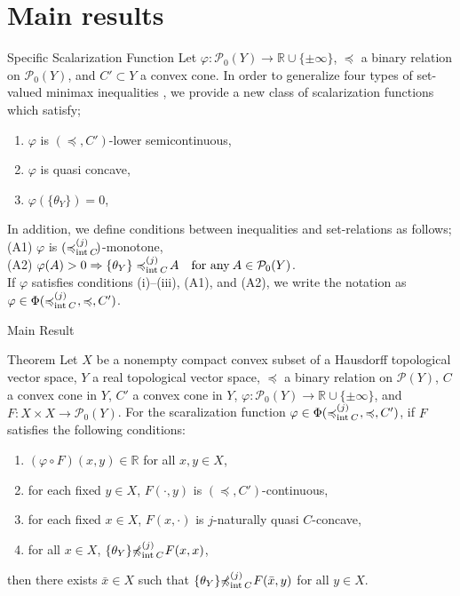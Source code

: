 \documentclass[aspectratio=169, dvipdfmx, 11pt]{beamer}
\newcommand{\RealNumberSet}{\mathbb{R}}
\newcommand{\Interior}[1]{\text{\rm int\:${#1}$}} %
\newcommand{\pow}[1]{\mathcal{P}_{0}(#1)}
\newcommand{\setrel}[2]{\preccurlyeq^{(#1)}_{#2}\!}
\newcommand{\notsetrel}[2]{{\not\preccurlyeq}^{(#1)}_{#2}\!}
\begin{document}
\section{Main results}

\begin{frame}{Specific Scalarization Function}
  Let $\varphi: \pow{Y} \to \RealNumberSet \cup \{\pm \infty\}$, $\preccurlyeq$ a binary relation
  on $\pow{Y}$, and $C' \subset Y$  a convex cone.
  In order to generalize four types of set-valued minimax inequalities \cite{MR2778674},
  we provide a new class of scalarization functions which satisfy;
  \begin{enumerate}
    \item $\varphi$ is $(\preccurlyeq, C')$-lower semicontinuous,
    \item $\varphi$ is quasi concave,
    \item $\varphi(\{\theta_{Y}\}) = 0$,
  \end{enumerate}
  In addition, we define conditions between inequalities and set-relations as follows;\\
  \vspace{2mm}
  (A1) $\varphi$ is $(\setrel{j}{\Interior{C}})$-monotone,\\
  (A2) $\varphi (A) > 0 \Rightarrow  \{\theta_Y\} \setrel{j}{\Interior{C}} A \quad\text{for any}\:A \in \pow{Y}$.\\
  \vspace{2mm}
  If $\varphi$ satisfies conditions (i)--(iii), (A1), and (A2),
  we write the notation as $\varphi \in \Phi(\setrel{j}{\Interior{C}}\:, \preccurlyeq, C')$.
\end{frame}

\begin{frame}{Main Result}
  \begin{block}{Theorem}
    Let $X$ be a nonempty compact convex subset of a Hausdorff topological vector space,
    $Y$ a real topological vector space, $\preccurlyeq$ a binary relation on $\mathcal{P}(Y)$,
    $C$ a convex cone in $Y$, $C'$ a convex cone in $Y$,
    $\varphi\colon \pow{Y} \to \RealNumberSet \cup \{\pm \infty\}$,
    and $F\colon X \times X \to \pow{Y}$.
    For the scaralization function $\varphi \in \Phi(\setrel{j}{\Interior{C}}\:, \preccurlyeq, C')$,
    if $F$ satisfies the following conditions:
    \begin{enumerate}
      \item $(\varphi \circ F)(x,y) \in \RealNumberSet$ for all $x,y \in X$,
      \item for each fixed $y \in X$, $F(\cdot,y)$ is $(\preccurlyeq, C')$-continuous,
      \item for each fixed $x \in X$, $F(x,\cdot)$ is $j$-naturally quasi $C$-concave,
      \item for all $x \in X$, $\{\theta_Y\} \notsetrel{j}{\Interior{C}}\: F(x,x) $,
    \end{enumerate}
    then there exists $\bar{x} \in X$ such that $\{\theta_Y\} \notsetrel{j}{\Interior{C}}\: F(\bar{x},y)$
    for all $y \in X$.
  \end{block}
\end{frame}
\end{document}
